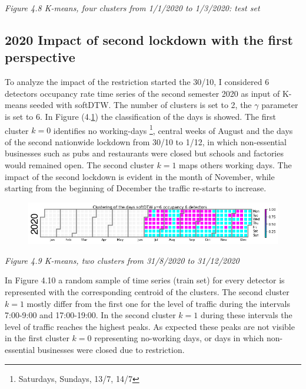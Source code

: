 \documentclass[11pt]{article}
\begin{document}
\emph{\small Figure 4.8 K-means, four clusters from 1/1/2020 to 1/3/2020: test set}

    \subsection{2020 Impact of second lockdown with the first perspective}

    To analyze the impact of the restriction started the 30/10, I considered
6 detectors occupancy rate time series of the second semester 2020 as
input of K-means seeded with softDTW. The number of clusters is set to
2, the \(\gamma\) parameter is set to 6. In Figure (4.\ref{fig:4.9}) the
classification of the days is showed. The first cluster \(k=0\)
identifies no working-days \footnote{ Saturdays, Sundays, 13/7, 14/7 },
central weeks of August and the days of the second nationwide lockdown
from 30/10 to 1/12, in which non-essential businesses such as pubs and
restaurants were closed but schools and factories would remained open.
The second cluster \(k=1\) maps others working days. The impact of the
second lockdown is evident in the month of November, while starting from
the beginning of December the traffic re-starts to increase.

    \begin{figure}
    \centering
    \includegraphics{softDTW K=2 sem2 2020.png}
    \caption{}
    \label{fig:4.9}
\end{figure}

\emph{\small Figure 4.9 K-means, two clusters from 31/8/2020 to 31/12/2020}

    In Figure 4.10 a random sample of time series (train set) for every
detector is represented with the corresponding centroid of the clusters.
The second cluster \(k=1\) mostly differ from the first one for the
level of traffic during the intervals 7:00-9:00 and 17:00-19:00. In the
second cluster \(k=1\) during these intervals the level of traffic
reaches the highest peaks. As expected these peaks are not visible in
the first cluster \(k=0\) representing no-working days, or days in which
non-essential businesses were closed due to restriction.
\end{document}
